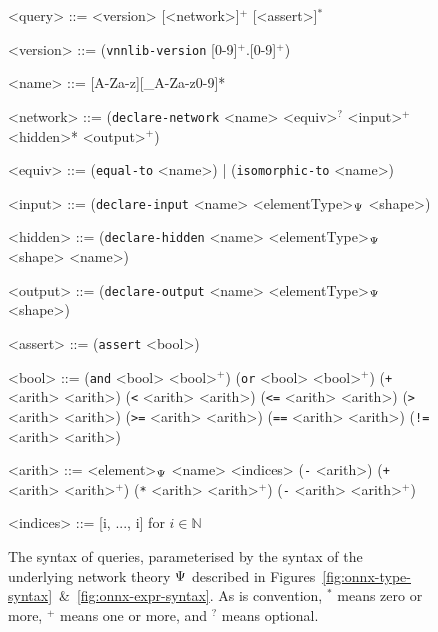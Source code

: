 \begin{figure}
	\setlength{\grammarindent}{6.5em}
	
	\begin{grammar}
	<query> ::= <version> [<network>]$^+$ [<assert>]$^*$
	
	<version> ::= (\texttt{vnnlib-version} [0-9]$^+$.[0-9]$^+$)
	
	<name> ::= [A-Za-z][\_A-Za-z0-9]*
		
	<network> ::= (\texttt{declare-network} <name> <equiv>$^?$ <input>$^+$ <hidden>* <output>$^+$)
	
	<equiv> ::= (\texttt{equal-to} <name>) | (\texttt{isomorphic-to} <name>)
	
	<input> ::= (\texttt{declare-input} <name> <elementType>$_\Psi$ <shape>)
	
	<hidden> ::= (\texttt{declare-hidden} <name> <elementType>$_\Psi$ <shape> <name>)
	
	<output> ::= (\texttt{declare-output} <name> <elementType>$_\Psi$ <shape>)
	
	<assert> ::= (\texttt{assert} <bool>)
	
	<bool> ::= (\texttt{and} <bool> <bool>$^+$)
	\alt (\texttt{or} <bool> <bool>$^+$)
	\alt (\texttt{+} <arith> <arith>)
	\alt (\texttt{\textless} <arith> <arith>)
	\alt (\texttt{\textless=} <arith> <arith>)
	\alt (\texttt{\textgreater} <arith> <arith>)
	\alt (\texttt{\textgreater=} <arith> <arith>)
	\alt (\texttt{==} <arith> <arith>)
	\alt (\texttt{!=} <arith> <arith>)
	
	<arith> ::= <element>$_\Psi$
	\alt <name> <indices>
	\alt (\texttt{-} <arith>)
	\alt (\texttt{+} <arith> <arith>$^+$)
	\alt (\texttt{*} <arith> <arith>$^+$)
	\alt (\texttt{-} <arith> <arith>$^+$)
	
	<indices> ::= [i, ..., i] for $i \in \mathbb{N}$
	\end{grammar}
	\vspace{-1em}
    \caption{The syntax of \vnnlib{} queries, parameterised by the syntax of the underlying network theory $\Psi$ described in Figures~\ref{fig:onnx-type-syntax}~\&~\ref{fig:onnx-expr-syntax}. As is convention, $^*$ means zero or more, $^+$ means one or more, and $^?$ means optional.}
    \label{fig:vnnlib-syntax}
\end{figure}

